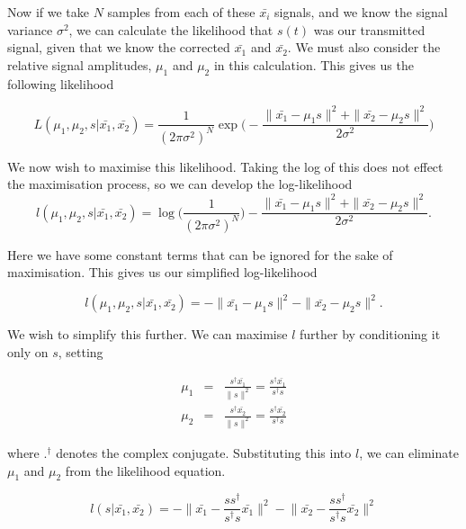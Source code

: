 \documentclass[12pt,openany,a4paper]{book}
\begin{document}
Now if we take $N$ samples from each of these $\bar{x_i}$ signals, and we know the signal variance $\sigma^2$, we can calculate the likelihood that $s(t)$ was our transmitted signal, given that we know the corrected $\bar{x_1}$ and $\bar{x_2}$. We must also consider the relative signal amplitudes, $\mu_1$ and $\mu_2$ in this calculation. This gives us the following likelihood

\begin{equation}
L(\mu_1,\mu_2, s | \bar{x_1}, \bar{x_2}) = \frac{1}{(2\pi\sigma^2)^N} \exp{
\Bigg(- \frac{\| \bar{x_1}-\mu_1 s\|^2 + \| \bar{x_2}-\mu_2 s\|^2}{2\sigma^2} \Bigg)}
\end{equation}

\bigskip

We now wish to maximise this likelihood. Taking the log of this does not effect the maximisation process, so we can develop the log-likelihood
\begin{equation}
l(\mu_1,\mu_2, s | \bar{x_1}, \bar{x_2}) = \log{\Bigg(\frac{1}{(2\pi\sigma^2)^N}\Bigg)}
- \frac{\| \bar{x_1}-\mu_1 s\|^2 + \| \bar{x_2}-\mu_2 s\|^2}{2\sigma^2}.
\end{equation}

\bigskip

Here we have some constant terms that can be ignored for the sake of maximisation. This gives us our simplified log-likelihood

\begin{equation}
l(\mu_1,\mu_2, s | \bar{x_1}, \bar{x_2}) = - \| \bar{x_1}-\mu_1 s\|^2 - \| \bar{x_2}-\mu_2 s\|^2.
\end{equation}

\bigskip

We wish to simplify this further. We can maximise $l$ further by conditioning it only on $s$, setting

\begin{eqnarray}
\mu_1 & = & \frac{s^\dagger \bar{x_1}}{\|s\|^2} =  \frac{s^\dagger \bar{x_1}}{s^\dagger s}\\
\mu_2 & = & \frac{s^\dagger \bar{x_2}}{\|s\|^2} =  \frac{s^\dagger \bar{x_2}}{s^\dagger s}
\end{eqnarray}

\bigskip

where $.^\dagger$ denotes the complex conjugate. Substituting this into $l$, we can eliminate $\mu_1$ and $\mu_2$ from the likelihood equation.

\begin{equation}
l(s | \bar{x_1}, \bar{x_2}) = - \bigg\| \bar{x_1}-\frac{ss^\dagger }{s^\dagger s} \bar{x_1} \bigg\|^2
- \bigg\| \bar{x_2}-\frac{ss^\dagger }{s^\dagger s} \bar{x_2} \bigg\|^2
\end{equation}
\end{document}
